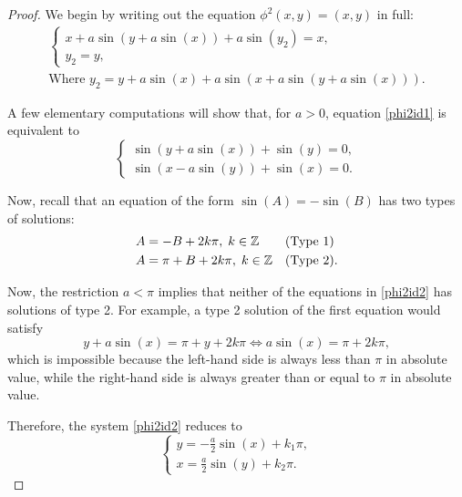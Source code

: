 \begin{proof}
We begin by writing out the equation $\phi^2(x,y) = (x,y)$ in full:
\begin{equation}\label{phi2id1}
\begin{gathered}
\begin{cases}
x + a \sin(y + a \sin(x)) + a \sin(y_2) = x,\\
y_2 = y,
\end{cases}\\
\text{Where $y_2 = y + a \sin(x) + a \sin(x + a \sin(y + a \sin(x)))$.}
\end{gathered}
\end{equation}

A few elementary computations will show that, for $a > 0$, equation \eqref{phi2id1} is equivalent to
\begin{equation}\label{phi2id2}
\begin{cases}
\sin(y + a \sin(x)) + \sin(y) = 0,\\
\sin(x - a \sin(y)) + \sin(x) = 0.
\end{cases}
\end{equation}

Now, recall that an equation of the form $\sin(A) = - \sin(B)$ has two types of solutions:
\begin{equation}
\begin{aligned}
A &= - B + 2 k \pi, \; k \in \mathbb{Z} && \text{(Type 1)}\\
A &= \pi + B + 2 k \pi, \; k \in \mathbb{Z} && \text{(Type 2).}
\end{aligned}
\end{equation}

Now, the restriction $a < \pi$ implies that neither of the equations in \eqref{phi2id2} has solutions of type 2. For example, a type 2 solution of the first equation would satisfy
\begin{equation}
y + a \sin(x) = \pi + y + 2 k \pi \iff a \sin(x) = \pi + 2 k \pi,
\end{equation}
which is impossible because the left-hand side is always less than $\pi$ in absolute value, while the right-hand side is always greater than or equal to $\pi$ in absolute value.

Therefore, the system \eqref{phi2id2} reduces to
\begin{equation}
\begin{cases}
y = - \frac a 2 \sin(x) + k_1 \pi,\\
x = \frac a 2 \sin(y) + k_2 \pi.
\end{cases}
\end{equation}


\end{proof}
